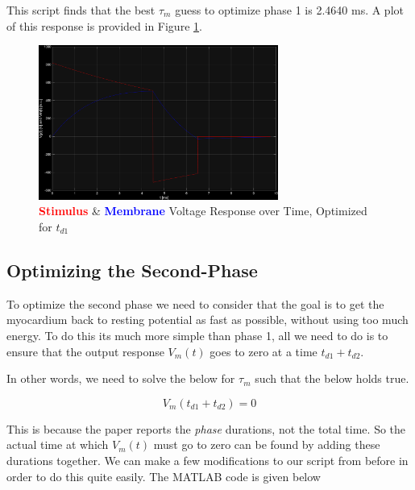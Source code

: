 \documentclass[]{report}
\begin{document}
This script finds that the best $\tau_m$ guess to optimize phase 1 is 2.4640 ms. A plot of this response is provided in Figure \ref{fig:phase1}.

\begin{figure}[H]
	\centering
	\includegraphics[width=0.7\textwidth]{phase1_response.png}
	\caption{\textcolor{red}{\textbf{Stimulus}} \& \textcolor{blue}{\textbf{Membrane}} Voltage Response over Time, Optimized for $t_{d1}$}
	\label{fig:phase1}
\end{figure}


\subsection*{Optimizing the Second-Phase}

To optimize the second phase we need to consider that the goal is to get the myocardium back to resting potential as fast as possible, without using too much energy. To do this its much more simple than phase 1, all we need to do is to ensure that the output response $V_m (t)$ goes to zero at a time $t_{d1} + t_{d2}$.

In other words, we need to solve the below for $\tau_m$ such that the below holds true.

\[
	V_m (t_{d1} + t_{d2}) = 0
\]

This is because the paper reports the \textit{phase} durations, not the total time. So the actual time at which $V_m (t)$ must go to zero can be found by adding these durations together. We can make a few modifications to our script from before in order to do this quite easily. The MATLAB code is given below
\end{document}
